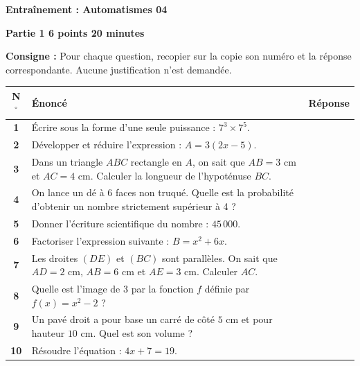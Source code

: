\documentclass[a4paper,11pt]{article}
\begin{document}
\pagestyle{empty}

\begin{center}
    \Large\textbf{Entraînement : Automatismes 04}
\end{center}

\noindent \textbf{Partie 1 \hfill 6 points \hfill 20 minutes}

\medskip
\noindent \textbf{Consigne :} Pour chaque question, recopier sur la copie son numéro et la réponse correspondante. Aucune justification n'est demandée.

\bigskip

\noindent
\begin{tabularx}{\textwidth}{|c|X|p{4cm}|}
\hline
\textbf{N$^{\circ}$} & \textbf{Énoncé} & \textbf{Réponse} \\ \hline
\textbf{1} & Écrire sous la forme d'une seule puissance : $7^3 \times 7^5$. & \\ \hline
\textbf{2} & Développer et réduire l'expression : $A = 3(2x - 5)$. & \\ \hline
\textbf{3} & Dans un triangle $ABC$ rectangle en $A$, on sait que $AB = 3\text{ cm}$ et $AC = 4\text{ cm}$. Calculer la longueur de l'hypoténuse $BC$. & \\ \hline
\textbf{4} & On lance un dé à 6 faces non truqué. Quelle est la probabilité d'obtenir un nombre strictement supérieur à 4 ? & \\ \hline
\textbf{5} & Donner l'écriture scientifique du nombre : $45\,000$. & \\ \hline
\textbf{6} & Factoriser l'expression suivante : $B = x^2 + 6x$. & \\ \hline
\textbf{7} & Les droites $(DE)$ et $(BC)$ sont parallèles. On sait que $AD = 2\text{ cm}$, $AB = 6\text{ cm}$ et $AE = 3\text{ cm}$. Calculer $AC$. & \\ \hline
\textbf{8} & Quelle est l'image de $3$ par la fonction $f$ définie par $f(x) = x^2 - 2$ ? & \\ \hline
\textbf{9} & Un pavé droit a pour base un carré de côté $5\text{ cm}$ et pour hauteur $10\text{ cm}$. Quel est son volume ? & \\ \hline
\textbf{10} & Résoudre l'équation : $4x + 7 = 19$. & \\ \hline
\end{tabularx}

\newpage
\end{document}
